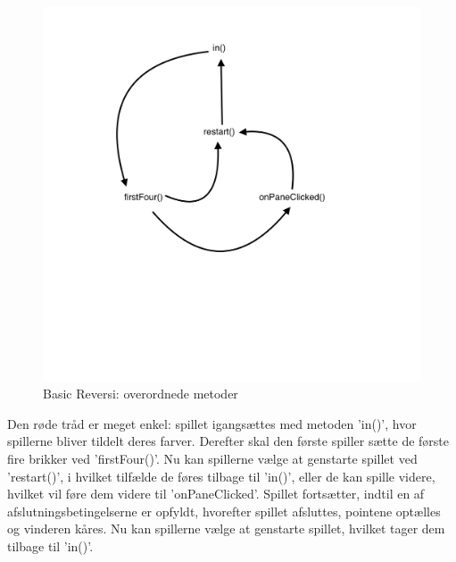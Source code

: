 \begin{figure}[H]
    \centering
    \caption{Basic Reversi: overordnede metoder}\label{BRF}
    \includegraphics[width=.5\textwidth]{Graphics/Basis.png}
\end{figure}

Den røde tråd er meget enkel: spillet igangsættes med metoden 'in()', hvor spillerne bliver tildelt deres farver. Derefter skal den første spiller sætte de første fire brikker ved 'firstFour()'. Nu kan spillerne vælge at genstarte spillet ved 'restart()', i hvilket tilfælde de føres tilbage til 'in()', eller de kan spille videre, hvilket vil føre dem videre til 'onPaneClicked'. Spillet fortsætter, indtil en af afslutningsbetingelserne er opfyldt, hvorefter spillet afsluttes, pointene optælles og vinderen kåres. Nu kan spillerne vælge at genstarte spillet, hvilket tager dem tilbage til 'in()'.
